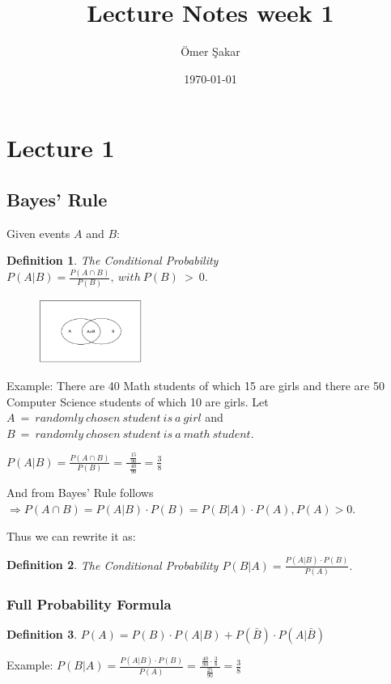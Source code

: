 \documentclass[12pt]{scrartcl}
\title{Lecture Notes week 1}
\author{\"Omer \c Sakar}
\date{\today}
\newtheorem{defi}{Definition}
\begin{document}
\maketitle
\tableofcontents
\newpage

\section{Lecture 1}

\subsection{Bayes' Rule}
Given events $A$ and $B$:\newline

\begin{defi}
 	The Conditional Probability $P(A | B) = \frac{P(A \cap B) }{P(B)},\ 	 with\ P(B)\ >\ 0.$
\end{defi}

\begin{figure}[h]
	\centering
	\includegraphics[width=0.3\textwidth]{./images/venn_diagram.png}
    \label{fig:formal_proof_ties}
\end{figure}

Example: There are 40 Math students of which 15 are girls and there are 50 Computer Science students of which 10 are girls.\newline
Let $A\ =\ randomly\ chosen\ student\ is\ a\ girl$ and $B\ =\ randomly\ chosen\ student\ is\ a\ math\ student$.
\newline

$P(A | B) = \frac{P(A \cap B)}{P(B)} = \frac{\ \ \frac{15}{90}\ \ }{\frac{40}{90}} = \frac{3}{8}$\newline

\noindent And from Bayes' Rule follows $\Rightarrow P(A \cap B) = P(A | B)\cdot P(B) = P(B|A)\cdot P(A), P(A) > 0$.

Thus we can rewrite it as:
\begin{defi}
 	The Conditional Probability $P(B | A) = \frac{P(A | B)\cdot P(B) }{P(A)}.$
\end{defi}

\subsubsection{Full Probability Formula}
\begin{defi}
	$P(A) = P(B) \cdot P(A | B) + P(\bar{B})\cdot P(A | \bar{B})$
\end{defi}
\noindent Example: $P(B | A) = \frac{P(A | B)\cdot P(B)}{P(A)} = \frac{\ \frac{40}{90}\cdot \frac{3}{8}\ }{\frac{25}{90}} = \frac{3}{8}$\newline
\end{document}

